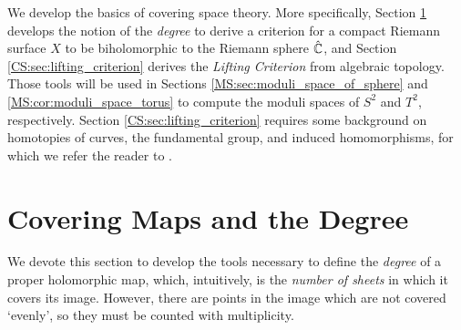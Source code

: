 \documentclass[../Moduli_Spaces_of_Riemann_Surfaces.tex]{subfiles}
\begin{document}
    We develop the basics of covering space theory. More specifically, Section \ref{CS:sec:covering_maps_degree} develops the notion of the \textit{degree} to derive a criterion for a compact Riemann surface $X$ to be biholomorphic to the Riemann sphere $\hat{\mathbb{C}}$, and Section \ref{CS:sec:lifting_criterion} derives the \textit{Lifting Criterion} from algebraic topology. Those tools will be used in Sections \ref{MS:sec:moduli_space_of_sphere} and \ref{MS:cor:moduli_space_torus} to compute the moduli spaces of $S^2$ and $T^2$, respectively. Section \ref{CS:sec:lifting_criterion} requires some background on homotopies of curves, the fundamental group, and induced homomorphisms, for which we refer the reader to \cite[][Chapter 1]{hatcher}.
    \section{Covering Maps and the Degree}\label{CS:sec:covering_maps_degree}
    We devote this section to develop the tools necessary to define the \textit{degree} of a proper holomorphic map, which, intuitively, is the \textit{number of sheets} in which it covers its image. However, there are points in the image which are not covered `evenly', so they must be counted with multiplicity.
\end{document}
